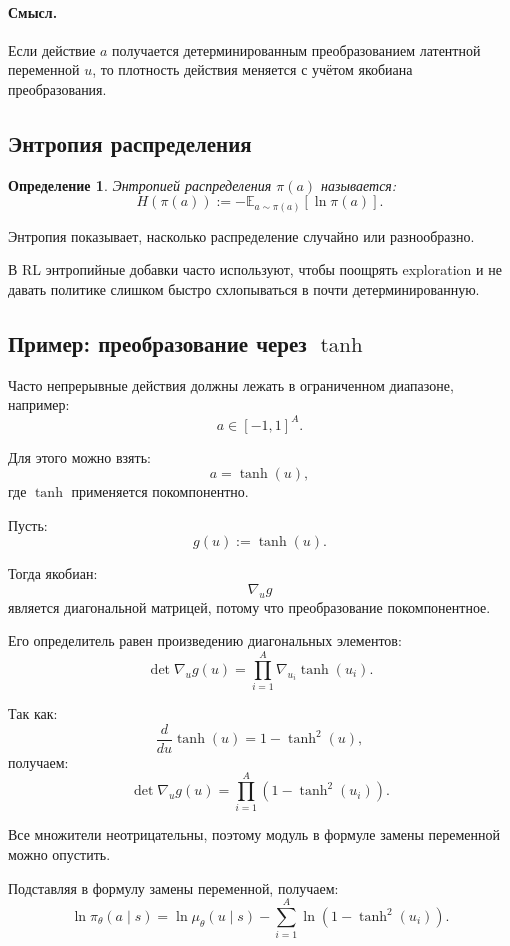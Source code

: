 \documentclass[12pt,a4paper]{article}
\newtheorem{definition}{Определение}
\begin{document}
\paragraph{Смысл.}

Если действие $a$ получается детерминированным преобразованием латентной переменной $u$, то плотность действия меняется с учётом якобиана преобразования.

\subsection{Энтропия распределения}

\begin{definition}
Энтропией распределения $\pi(a)$ называется:
\[
H(\pi(a))
:=
-
\mathbb E_{a\sim\pi(a)}
\left[
\ln \pi(a)
\right].
\]
\end{definition}

Энтропия показывает, насколько распределение случайно или разнообразно.

В RL энтропийные добавки часто используют, чтобы поощрять exploration и не давать политике слишком быстро схлопываться в почти детерминированную.

\subsection{Пример: преобразование через $\tanh$}

Часто непрерывные действия должны лежать в ограниченном диапазоне, например:
\[
a\in[-1,1]^A.
\]

Для этого можно взять:
\[
a=\tanh(u),
\]
где $\tanh$ применяется покомпонентно.

Пусть:
\[
g(u):=\tanh(u).
\]

Тогда якобиан:
\[
\nabla_u g
\]
является диагональной матрицей, потому что преобразование покомпонентное.

Его определитель равен произведению диагональных элементов:
\[
\det\nabla_u g(u)
=
\prod_{i=1}^{A}
\nabla_{u_i}\tanh(u_i).
\]

Так как:
\[
\frac{d}{du}\tanh(u)
=
1-\tanh^2(u),
\]
получаем:
\[
\det\nabla_u g(u)
=
\prod_{i=1}^{A}
\left(
1-\tanh^2(u_i)
\right).
\]

Все множители неотрицательны, поэтому модуль в формуле замены переменной можно опустить.

Подставляя в формулу замены переменной, получаем:
\[
\ln \pi_\theta(a\mid s)
=
\ln \mu_\theta(u\mid s)
-
\sum_{i=1}^{A}
\ln
\left(
1-\tanh^2(u_i)
\right).
\]
\end{document}
